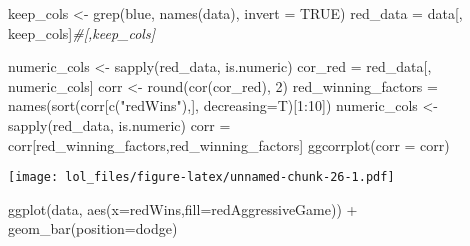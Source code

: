 \documentclass[
]{article}
\newenvironment{Shaded}{\begin{snugshade}}{\end{snugshade}}
\newcommand{\AttributeTok}[1]{\textcolor[rgb]{0.77,0.63,0.00}{#1}}
\newcommand{\CommentTok}[1]{\textcolor[rgb]{0.56,0.35,0.01}{\textit{#1}}}
\newcommand{\ConstantTok}[1]{\textcolor[rgb]{0.00,0.00,0.00}{#1}}
\newcommand{\DecValTok}[1]{\textcolor[rgb]{0.00,0.00,0.81}{#1}}
\newcommand{\FunctionTok}[1]{\textcolor[rgb]{0.00,0.00,0.00}{#1}}
\newcommand{\NormalTok}[1]{#1}
\newcommand{\OtherTok}[1]{\textcolor[rgb]{0.56,0.35,0.01}{#1}}
\newcommand{\SpecialCharTok}[1]{\textcolor[rgb]{0.00,0.00,0.00}{#1}}
\newcommand{\StringTok}[1]{\textcolor[rgb]{0.31,0.60,0.02}{#1}}
\begin{document}
\begin{Shaded}
\begin{Highlighting}[]
\NormalTok{keep\_cols }\OtherTok{\textless{}{-}} \FunctionTok{grep}\NormalTok{(}\StringTok{\textquotesingle{}blue\textquotesingle{}}\NormalTok{, }\FunctionTok{names}\NormalTok{(data), }\AttributeTok{invert =} \ConstantTok{TRUE}\NormalTok{)}
\NormalTok{red\_data }\OtherTok{=}\NormalTok{ data[, keep\_cols]}\CommentTok{\#[,keep\_cols]}
\end{Highlighting}
\end{Shaded}

\begin{Shaded}
\begin{Highlighting}[]
\NormalTok{numeric\_cols }\OtherTok{\textless{}{-}} \FunctionTok{sapply}\NormalTok{(red\_data, is.numeric)}
\NormalTok{cor\_red }\OtherTok{=}\NormalTok{ red\_data[, numeric\_cols]}
\NormalTok{corr }\OtherTok{\textless{}{-}} \FunctionTok{round}\NormalTok{(}\FunctionTok{cor}\NormalTok{(cor\_red), }\DecValTok{2}\NormalTok{)}
\NormalTok{red\_winning\_factors }\OtherTok{=} \FunctionTok{names}\NormalTok{(}\FunctionTok{sort}\NormalTok{(corr[}\FunctionTok{c}\NormalTok{(}\StringTok{"redWins"}\NormalTok{),], }\AttributeTok{decreasing=}\NormalTok{T)[}\DecValTok{1}\SpecialCharTok{:}\DecValTok{10}\NormalTok{])}
\NormalTok{numeric\_cols }\OtherTok{\textless{}{-}} \FunctionTok{sapply}\NormalTok{(red\_data, is.numeric)}
\NormalTok{corr }\OtherTok{=}\NormalTok{ corr[red\_winning\_factors,red\_winning\_factors]}
\FunctionTok{ggcorrplot}\NormalTok{(}\AttributeTok{corr =}\NormalTok{ corr)}
\end{Highlighting}
\end{Shaded}

\texttt{[image: lol\_files/figure-latex/unnamed-chunk-26-1.pdf]}

\begin{Shaded}
\end{Shaded}

\begin{Shaded}
\begin{Highlighting}[]
\FunctionTok{ggplot}\NormalTok{(data, }\FunctionTok{aes}\NormalTok{(}\AttributeTok{x=}\NormalTok{redWins,}\AttributeTok{fill=}\NormalTok{redAggressiveGame)) }\SpecialCharTok{+} 
  \FunctionTok{geom\_bar}\NormalTok{(}\AttributeTok{position=}\StringTok{\textquotesingle{}dodge\textquotesingle{}}\NormalTok{)}
\end{Highlighting}
\end{Shaded}
\end{document}
